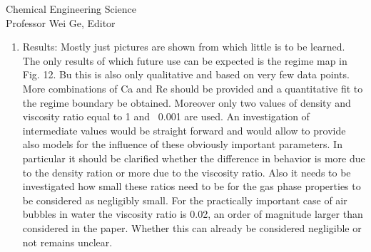 \documentclass{letter}
\begin{document}
\begin{letter}{
Chemical Engineering Science\\
Professor Wei Ge, Editor\\}
\begin{enumerate}
\par\noindent
\item
\textsf
{Results: Mostly just pictures are shown from which little is to be learned. The only results of which future use can be expected is the regime map in Fig. 12. Bu this is also only qualitative and based on very few data points. More combinations of Ca and Re should be provided and a quantitative fit to the regime boundary be obtained. Moreover only two values of density and viscosity ratio equal to 1 and ~0.001 are used. An investigation of intermediate values would be straight forward and would allow to provide also models for the influence of these obviously important parameters. In particular it should be clarified whether the difference in behavior is more due to the density ration or more due to the viscosity ratio. Also it needs to be investigated how small these ratios need to be for the gas phase properties to be considered as negligibly small. For the practically important case of air bubbles in water the viscosity ratio is 0.02, an order of magnitude larger than considered in the paper. Whether this can already be considered negligible or not remains unclear.}
\vspace{3 mm}


\end{enumerate}
\end{letter}
\end{document}
